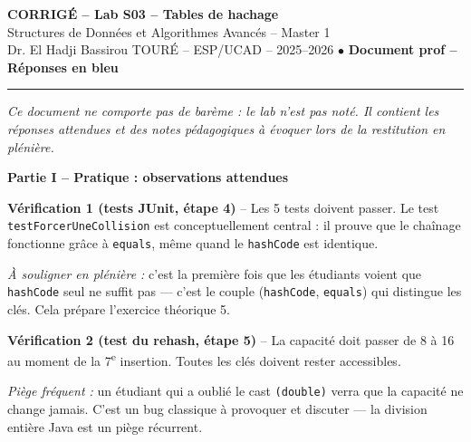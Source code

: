 \documentclass[10pt,a4paper]{article}
\newcommand{\corm}[1]{{\color{corrcolor}#1}}
\begin{document}
\begin{center}
\textbf{\large CORRIGÉ -- Lab S03 -- Tables de hachage}\\[0.05cm]
{\small Structures de Données et Algorithmes Avancés -- Master 1}\\[0.02cm]
{\small Dr. El Hadji Bassirou TOURÉ -- ESP/UCAD -- 2025--2026} \quad $\bullet$ \quad
\textcolor{corrcolor}{\textbf{Document prof -- Réponses en bleu}}
\end{center}

\vspace{-0.1cm}
\hrule
\vspace{0.25cm}

{\small\textit{Ce document ne comporte pas de barème : le lab n'est pas noté. Il contient les réponses attendues et des notes pédagogiques à évoquer lors de la restitution en plénière.}}

\vspace{0.3cm}


\textbf{\Large Partie I -- Pratique : observations attendues}

\vspace{0.3cm}

\textbf{Vérification 1 (tests JUnit, étape 4)} -- Les 5 tests doivent passer. Le test \texttt{testForcerUneCollision} est conceptuellement central : il prouve que le chaînage fonctionne grâce à \texttt{equals}, même quand le \texttt{hashCode} est identique.

\medskip

\corm{\textit{À souligner en plénière :} c'est la première fois que les étudiants voient que \texttt{hashCode} seul ne suffit pas --- c'est le couple (\texttt{hashCode}, \texttt{equals}) qui distingue les clés. Cela prépare l'exercice théorique 5.}

\vspace{0.25cm}

\textbf{Vérification 2 (test du rehash, étape 5)} -- La capacité doit passer de 8 à 16 au moment de la 7\textsuperscript{e} insertion. Toutes les clés doivent rester accessibles.

\medskip

\corm{\textit{Piège fréquent :} un étudiant qui a oublié le cast \texttt{(double)} verra que la capacité ne change jamais. C'est un bug classique à provoquer et discuter --- la division entière Java est un piège récurrent.}
\end{document}
